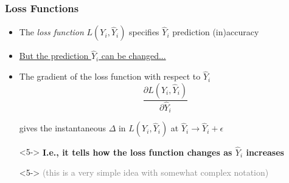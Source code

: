 \documentclass[xcolor={dvipsnames}]{beamer}
\begin{document}
\frame
{
 \frametitle{Loss Functions}

\begin{itemize}
\item<1-> The \emph{loss function} $L(Y_i, \hat Y_i)$ specifies $\hat Y_i$ prediction (in)accuracy  

\item<2-> \underline{But the prediction $\hat Y_i$ can be changed... } 
\item<4-> The gradient of the loss function with respect to $\hat Y_i$ 
$$\frac{\partial L(Y_i, \hat Y_i)}{\partial \hat Y_i}$$

gives the instantaneous $\Delta$ in $L(Y_i, \hat Y_i)$ at  $\hat Y_i \longrightarrow \hat Y_i + \epsilon$
\item[] 
\item[]<5-> \textbf{I.e., it tells how the loss function changes as $\hat Y_i$ increases}
\item[]<5-> \textcolor{gray}{(this is a very simple idea with somewhat complex notation)}

\end{itemize}
}
\end{document}

